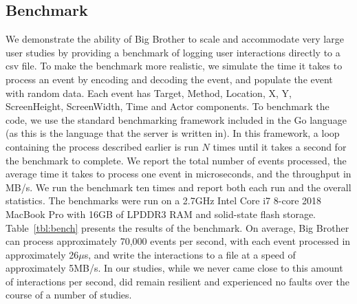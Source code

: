 \subsection{Benchmark}

We demonstrate the ability of Big Brother to scale and accommodate very large user studies by providing a benchmark of logging user interactions directly to a csv file. To make the benchmark more realistic, we simulate the time it takes to process an event by encoding and decoding the event, and populate the event with random data. Each event has Target, Method, Location, X, Y, ScreenHeight, ScreenWidth, Time and Actor components. To benchmark the code, we use the standard benchmarking framework included in the Go language (as this is the language that the server is written in). In this framework, a loop containing the process described earlier is run $N$ times until it takes a second for the benchmark to complete. We report the total number of events processed, the average time it takes to process one event in microseconds, and the throughput in MB/s. We run the benchmark ten times and report both each run and the overall statistics. The benchmarks were run on a 2.7GHz Intel Core i7 8-core 2018 MacBook Pro with 16GB of LPDDR3 RAM and solid-state flash storage. Table~\ref{tbl:bench} presents the results of the benchmark. On average, Big Brother can process approximately 70,000 events per second, with each event processed in approximately 26$\mu$s, and write the interactions to a file at a speed of approximately 5MB/s. In our studies, while we never came close to this amount of interactions per second, \bb did remain resilient and experienced no faults over the course of a number of studies.


